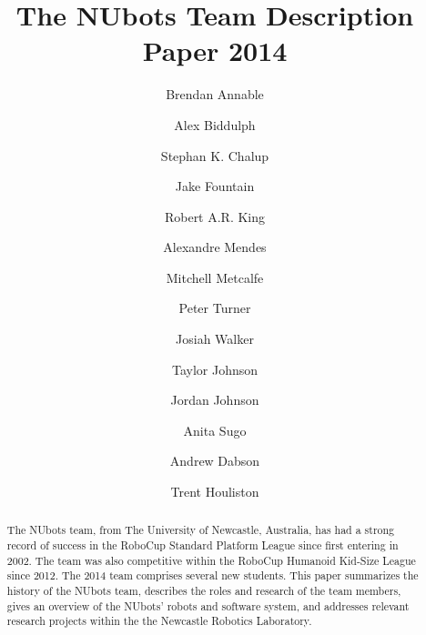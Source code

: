 \documentclass{llncs}
\begin{document}
%

\frontmatter          %
%
\pagestyle{headings}  %
%
%
\mainmatter              %
%
\title{The NUbots Team Description Paper 2014}
%

\author{Brendan Annable \and Alex Biddulph \and Stephan K. Chalup \and Jake Fountain \and Robert A.R. King \and Alexandre Mendes \and Mitchell Metcalfe \and Peter Turner \and Josiah Walker \and Taylor Johnson \and Jordan Johnson \and Anita Sugo \and Andrew Dabson \and Trent Houliston}
%
%
%
%

\maketitle              %

\begin{abstract}
The NUbots team, from The University of Newcastle, Australia, has had a strong record of success in the RoboCup Standard Platform League since first entering in 2002. The team was also competitive within the RoboCup Humanoid Kid-Size League since 2012. The 2014 team comprises several new students. This paper summarizes the history of the NUbots team, describes the roles and research of the team members, gives an overview of the NUbots' robots and software system, and addresses relevant research projects within the the Newcastle Robotics Laboratory.
\end{abstract}
\end{document}
